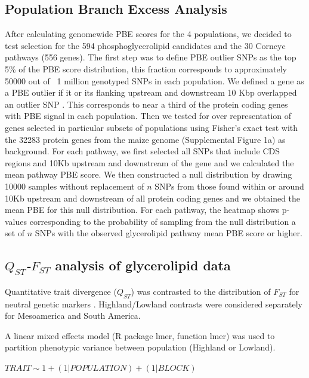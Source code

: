 \documentclass[9pt,twocolumn,twoside,lineno]{gsajnl}
\begin{document}
\subsection{Population Branch Excess Analysis}
After calculating genomewide PBE scores for the 4 populations, we decided to test selection for the 594 phosphoglycerolipid candidates and the 30 Corncyc pathways (556 genes). The first step was to define PBE outlier SNPs as the top 5\% of the PBE score distribution, this fraction corresponds to approximately 50000 out of ~1 million genotyped SNPs in each population. We defined a gene as a PBE outlier if it or its flanking upstream and downstream 10 Kbp overlapped an outlier SNP \cite{Wang2020-mp}. This corresponds to near a third of the protein coding genes with PBE signal in each population. 
Then we tested for over representation of genes selected in particular subsets of populations using Fisher's exact test with the 32283 protein genes from the maize genome (Supplemental Figure 1a) \cite{wang2015a} as background. 
For each pathway, we first selected all SNPs that include CDS regions and 10Kb upstream and downstream of the gene and we calculated the mean pathway PBE score. 
We then constructed a null distribution by drawing 10000 samples without replacement of $n$ SNPs from those found within or around 10Kb upstream and downstream of all protein coding genes and we obtained the mean PBE for this null distribution. 
For each pathway, the heatmap shows p-values corresponding to the probability of sampling from the null distribution a set of $n$ SNPs with the observed glycerolipid pathway mean PBE score or higher.



\subsection{\textit{$Q_{ST}$-$F_{ST}$} analysis of glycerolipid data}

Quantitative trait divergence ($Q_{ST}$) was contrasted to the distribution of $F_{ST}$ for neutral genetic markers \citep{whitlock2008evolutionary}.
Highland/Lowland contrasts were considered separately for Mesoamerica and South America.

A linear mixed effects model (R package lmer, function lmer) was used to partition phenotypic variance between population (Highland or Lowland).

\begin{center}
${ TRAIT \sim 1 + (1|POPULATION) + (1|BLOCK) }$
\end{center}
\end{document}
